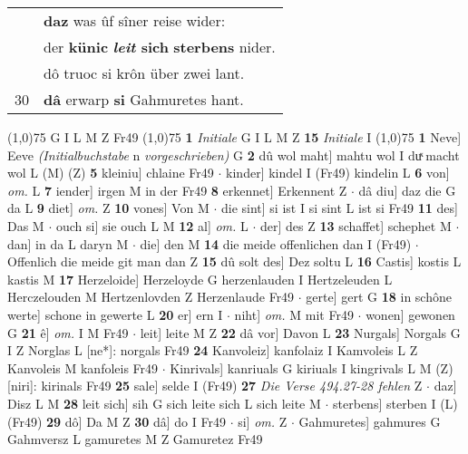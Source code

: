 \documentclass[8pt,a4paper,notitlepage]{article}
\begin{document}
\begin{table}[ht]
\begin{minipage}[t]{0.5\linewidth}
\begin{tabular}{rl}
 & \textbf{daz} was ûf sîner reise wider:\\ 
 & der \textbf{künic} \textbf{\textit{leit} sich} \textbf{sterbens} nider.\\ 
 & dô truoc si krôn über zwei lant.\\ 
30 & \textbf{dâ} erwarp \textbf{si} Gahmuretes hant.\\ 
\end{tabular}
\scriptsize
\line(1,0){75} \newline
G I L M Z Fr49 \newline
\line(1,0){75} \newline
\textbf{1} \textit{Initiale} G I L M Z  \textbf{15} \textit{Initiale} I  \newline
\line(1,0){75} \newline
\textbf{1} Neve] Eeve \textit{(Initialbuchstabe} n\textit{ vorgeschrieben)} G \textbf{2} dû wol maht] mahtu wol I duͯ macht wol L (M) (Z) \textbf{5} kleiniu] chlaine Fr49  $\cdot$ kinder] kindel I (Fr49) kindelin L \textbf{6} von] \textit{om.} L \textbf{7} iender] irgen M in der Fr49 \textbf{8} erkennet] Erkennent Z  $\cdot$ dâ diu] daz die G da L \textbf{9} diet] \textit{om.} Z \textbf{10} vones] Von M  $\cdot$ die sint] si ist I si sint L ist si Fr49 \textbf{11} des] Das M  $\cdot$ ouch si] sie ouch L M \textbf{12} al] \textit{om.} L  $\cdot$ der] des Z \textbf{13} schaffet] schephet M  $\cdot$ dan] in da L daryn M  $\cdot$ die] den M \textbf{14} die meide offenlichen dan I (Fr49)  $\cdot$ Offenlich die meide git man dan Z \textbf{15} dû solt des] Dez soltu L \textbf{16} Castis] kostis L kastis M \textbf{17} Herzeloide] Herzeloyde G herzenlauden I Hertzeleuden L Herczelouden M Hertzenlovden Z Herzenlaude Fr49  $\cdot$ gerte] gert G \textbf{18} in schône werte] schone in gewerte L \textbf{20} er] ern I  $\cdot$ niht] \textit{om.} M mit Fr49  $\cdot$ wonen] gewonen G \textbf{21} ê] \textit{om.} I M Fr49  $\cdot$ leit] leite M Z \textbf{22} dâ vor] Davon L \textbf{23} Nurgals] Norgals G I Z Norglas L [ne*]: norgals Fr49 \textbf{24} Kanvoleiz] kanfolaiz I Kamvoleis L Z Kanvoleis M kanfoleis Fr49  $\cdot$ Kinrivals] kanriuals G kiriuals I kingrivals L M (Z) [niri]: kirinals  Fr49 \textbf{25} sale] selde I (Fr49) \textbf{27} \textit{Die Verse 494.27-28 fehlen} Z   $\cdot$ daz] Disz L M \textbf{28} leit sich] sih G sich leite sich L sich leite M  $\cdot$ sterbens] sterben I (L) (Fr49) \textbf{29} dô] Da M Z \textbf{30} dâ] do I Fr49  $\cdot$ si] \textit{om.} Z  $\cdot$ Gahmuretes] gahmures G Gahmversz L gamuretes M Z Gamuretez Fr49 \newline

\end{minipage}
\end{table}
\end{document}
